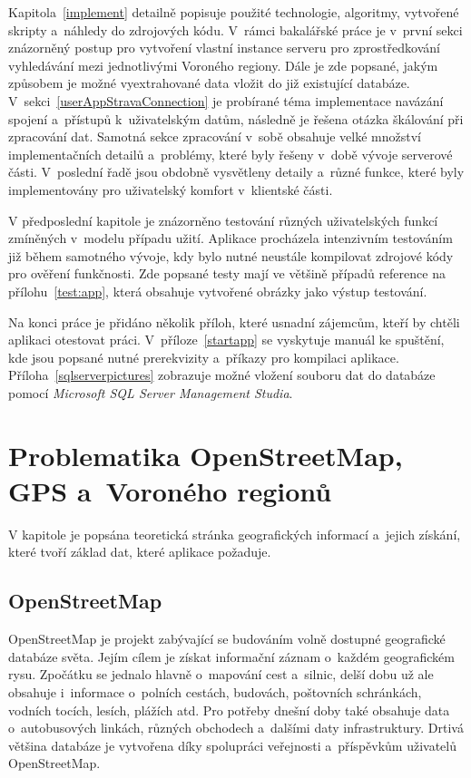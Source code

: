 Kapitola~\ref{implement} detailně popisuje použité technologie, algoritmy, vytvořené skripty a~náhledy do zdrojových kódu. V~rámci bakalářské práce je v~první sekci znázorněný postup pro vytvoření vlastní instance serveru pro zprostředkování vyhledávání mezi jednotlivými Voroného regiony.  Dále je zde popsané, jakým způsobem je možné vyextrahované data vložit do již existující databáze. V~sekci~\ref{userAppStravaConnection} je probírané téma implementace navázání spojení a~přístupů k~uživatelským datům, následně je řešena otázka škálování při zpracování dat. Samotná sekce zpracování v~sobě obsahuje velké množství implementačních detailů a~problémy, které byly řešeny v~době vývoje serverové části. V~poslední řadě jsou obdobně vysvětleny detaily a~různé funkce, které byly implementovány pro uživatelský komfort v~klientské části. 

V předposlední kapitole je znázorněno testování různých uživatelských funkcí zmíněných v~modelu případu užití. Aplikace procházela intenzivním testováním již během samotného vývoje, kdy bylo nutné neustále kompilovat zdrojové kódy pro ověření funkčnosti. Zde popsané testy mají ve většině případů reference na přílohu~\ref{test:app}, která obsahuje vytvořené obrázky jako výstup testování. 

Na konci práce je přidáno několik příloh, které usnadní zájemcům, kteří by chtěli aplikaci otestovat práci. V~příloze~\ref{startapp} se vyskytuje manuál ke spuštění, kde jsou popsané nutné prerekvizity a~příkazy pro kompilaci aplikace. Příloha~\ref{sqlserverpictures} zobrazuje možné vložení souboru dat do databáze pomocí \emph{Microsoft SQL Server Management Studia}.

\chapter{Problematika OpenStreetMap, GPS a~Voroného regionů}
\label{theory}
V kapitole je popsána teoretická stránka geografických informací a~jejich získání, které tvoří základ dat, které aplikace požaduje.

\section{OpenStreetMap}
OpenStreetMap je projekt zabývající se budováním volně dostupné geografické databáze světa. Jejím cílem je získat informační záznam o~každém geografickém rysu. Zpočátku se jednalo hlavně o~mapování cest a~silnic, delší dobu už ale obsahuje i~informace o~polních cestách, budovách, poštovních schránkách, vodních tocích, lesích, plážích atd. Pro potřeby dnešní doby také obsahuje data o~autobusových linkách, různých obchodech a~dalšími daty infrastruktury. Drtivá většina databáze je vytvořena díky spolupráci veřejnosti a~příspěvkům uživatelů OpenStreetMap. \cite{openstreetmap}

